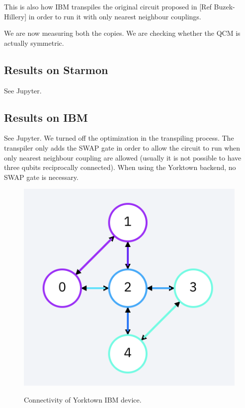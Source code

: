 \documentclass[11pt]{article}
\begin{document}
This is also how IBM transpiles the original circuit proposed in [Ref Buzek-Hillery] in order to run it with only nearest neighbour couplings.

We are now measuring both the copies. We are checking whether the QCM is actually symmetric.
\subsection{Results on Starmon}
See Jupyter.
\subsection{Results on IBM}
See Jupyter.
We turned off the optimization in the transpiling process. The transpiler only adds the SWAP gate in order to allow the circuit to run when only nearest neighbour coupling are allowed (usually it is not possible to have three qubits reciprocally connected).
When using the Yorktown backend, no SWAP gate is necessary.
\begin{figure}[H]
    \centering
            \includegraphics[totalheight=6cm]{Figures/yorktownconnectivity.png}
        \label{fig:2a}\caption{Connectivity of Yorktown IBM device.}
\end{figure}
\end{document}
